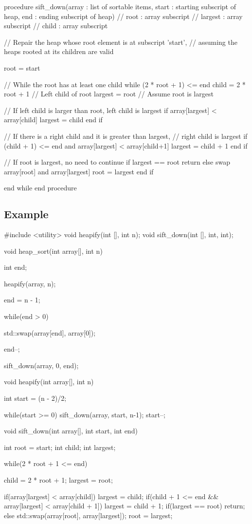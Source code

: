 \documentclass{report}
\begin{document}
    \pagebreak 
    \bigbreak \noindent 
    \begin{cppcode}
procedure sift_down(array : list of sortable items, start : starting
  subscript of heap, end : ending subscript of heap)
    // root : array subscript
    // largest : array subscript
    // child : array subscript

    // Repair the heap whose root element is at subscript 'start',
    // assuming the heaps rooted at its children are valid

    root = start

    // While the root has at least one child
    while (2 * root + 1) <= end
        child = 2 * root + 1 // Left child of root
        largest = root // Assume root is largest

        // If left child is larger than root, left child is largest
        if array[largest] < array[child]
            largest = child
        end if

        // If there is a right child and it is greater than largest,
        // right child is largest
        if (child + 1) <= end and array[largest] < array[child+1]
            largest = child + 1
        end if

        // If root is largest, no need to continue
        if largest == root
            return
        else
            swap array[root] and array[largest]
            root = largest
        end if

    end while
end procedure
    \end{cppcode}

    \pagebreak 
    \subsection{Example}
    \bigbreak \noindent 
    \begin{cppcode}
#include <utility>
void heapify(int [], int n);
void sift_down(int [], int, int);

void heap_sort(int array[], int n) {
	int end;
	
	heapify(array, n);
	
	end = n - 1;
	
	while(end > 0) {
		std::swap(array[end], array[0]);
		
		end--;
		
		sift_down(array, 0, end);
	}
}
void heapify(int array[], int n) {
	int start = (n - 2)/2;
	
	while(start >= 0) {
		sift_down(array, start, n-1);
		start--;
	}
}
void sift_down(int array[], int start, int end) {
	int root = start;
	int child;
	int largest;
	
	while(2 * root + 1 <= end) {
		child = 2 * root + 1;
		largest = root;
		
		if(array[largest] < array[child]) {
			largest = child;
		}
		if(child + 1 <= end && array[largest] < array[child + 1]) {
			largest = child + 1;
		}
		if(largest == root) { return; } else {
			std::swap(array[root], array[largest]);
			root = largest;
		}
	}
}
    \end{cppcode}
\end{document}
